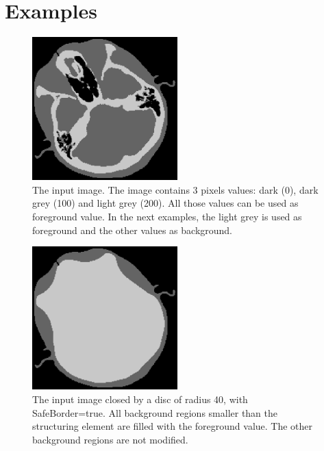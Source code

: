 \documentclass[IJ]{cesj}
\begin{document}
\section{Examples}

\begin{figure}[b]
\centering
\includegraphics[width=0.5\textwidth]{2th_cthead1.eps}
\caption{The input image. The image contains 3 pixels values: dark (0), dark grey (100) and light grey (200). All those values can be used as foreground value. In the next examples, the light grey is used as foreground and the other values as background.}
\end{figure}

\begin{figure}
\centering
\includegraphics[width=0.5\textwidth]{close.eps}
\caption{The input image closed by a disc of radius 40, with SafeBorder=true. All background regions smaller than the structuring element are filled with the foreground value. The other background regions are not modified.}
\end{figure}
\end{document}
